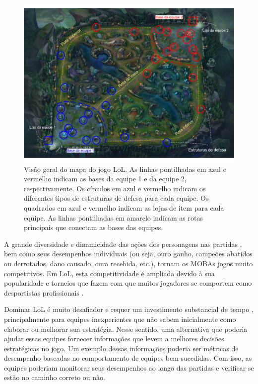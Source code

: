 \begin{figure}
  \centering
  \includegraphics[width=1.0\textwidth]{map}%
  \caption{Visão geral do mapa do jogo LoL. As linhas pontilhadas em azul e vermelho indicam as bases da equipe 1 e da equipe 2, respectivamente.  Os círculos em azul e vermelho indicam os diferentes tipos de estruturas de defesa para cada equipe. Os quadrados em azul e vermelho indicam as lojas de item para cada equipe. As linhas pontilhadas em amarelo indicam as rotas principais que conectam as bases das equipes.}
  \label{fig:map}
\end{figure}

A grande diversidade e dinamicidade das ações dos personagens nas partidas \cite{drachen2014skill}, bem como seus desempenhos individuais (ou seja, ouro ganho, campeões abatidos ou derrotados, dano causado, cura recebida, etc.), tornam os MOBAs jogos muito competitivos. Em LoL, esta competitividade é ampliada devido à sua popularidade e torneios que fazem com que muitos jogadores se comportem como desportistas profissionais \cite{rioult2014mining}.

Dominar LoL é muito desafiador e requer um investimento substancial de tempo \cite{drachen2014skill}, principalmente para equipes inexperientes que não sabem inicialmente como elaborar ou melhorar sua estratégia. Nesse sentido, uma alternativa que poderia ajudar essas equipes  fornecer informações que levem a melhores decisões estratégicas no jogo. Um exemplo dessas informações poderia ser métricas de desempenho baseadas no comportamento de equipes bem-sucedidas. Com isso, as equipes poderiam monitorar seus desempenhos ao longo das partidas e verificar se estão no caminho correto ou não. 

